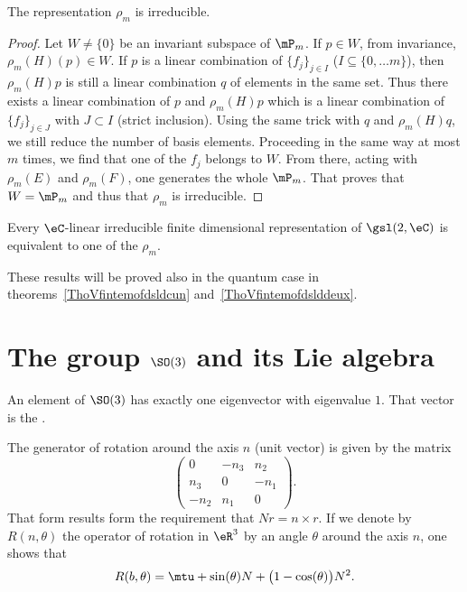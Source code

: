 \begin{proposition}     \label{ProprhomirredsldeuxC}
	The representation $\rho_m$ is irreducible.
\end{proposition}

\begin{proof}
	Let $W\neq\{ 0 \}$ be an invariant subspace of $\mP_m$. If $p\in W$, from invariance, $\rho_m(H)(p)\in W$. If $p$ is a linear combination of $\{ f_j \}_{j\in I}$ ($I\subseteq \{ 0,\ldots m \}$), then $\rho_m(H)p$ is still a linear combination $q$ of elements in the same set. Thus there exists a linear combination of $p$ and $\rho_m(H)p$ which is a linear combination of $\{ f_j \}_{j\in J}$ with $J\subset I$ (strict inclusion). Using the same trick with $q$ and $\rho_m(H)q$, we still reduce the number of basis elements. Proceeding in the same way at most $m$ times, we find that one of the $f_j$ belongs to $W$. From there, acting with $\rho_m(E)$ and $\rho_m(F)$, one generates the whole $\mP_m$. That proves that $W=\mP_m$ and thus that $\rho_m$ is irreducible.
\end{proof}

\begin{theorem}
	Every $\eC$-linear irreducible finite dimensional representation of $\gsl(2,\eC)$ is equivalent to one of the $\rho_m$.
\end{theorem}

These results will be proved also in the quantum case in theorems~\ref{ThoVfintemofdsldcun} and~\ref{ThoVfintemofdslddeux}.

\section{The group \texorpdfstring{$\SO(3)$}{SO3} and its Lie algebra}
\label{SubSecTheGroupSotrois}

\begin{proposition}
	An element of $\SO(3)$ has exactly one eigenvector with eigenvalue $1$. That vector is the .
\end{proposition}

The generator of rotation around the axis $n$ (unit vector) is given by the matrix
\begin{equation}
	\begin{pmatrix}
		0    & -n_3 & n_2  \\
		n_3  & 0    & -n_1 \\
		-n_2 & n_1  & 0
	\end{pmatrix}.
\end{equation}
That form results form the requirement that $Nr=n\times r$. If we denote by $R(n,\theta)$ the operator of rotation in $\eR^3$ by an angle $\theta$ around the axis $n$, one shows that
\begin{equation}
	R(b,\theta)=\mtu+\sin(\theta) N+\big(1-\cos(\theta)\big)N^2.
\end{equation}

